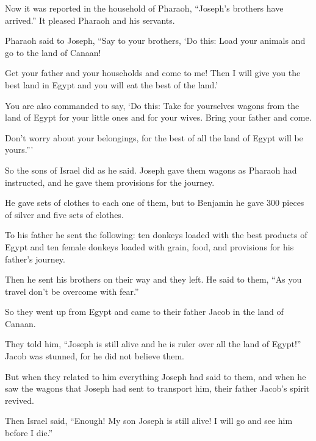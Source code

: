 \begin{scripture}
 Now it was reported in the household of Pharaoh, ``Joseph's brothers have arrived.'' It pleased Pharaoh and his servants.
 Pharaoh said to Joseph, ``Say to your brothers, `Do this: Load your animals and go to the land of Canaan!
 Get your father and your households and come to me! Then I will give you the best land in Egypt and you will eat the best of the land.'
 You are also commanded to say, `Do this: Take for yourselves wagons from the land of Egypt for your little ones and for your wives. Bring your father and come.
 Don't worry about your belongings, for the best of all the land of Egypt will be yours.'''
\everypar{}

 So the sons of Israel did as he said. Joseph gave them wagons as Pharaoh had instructed, and he gave them provisions for the journey.
 He gave sets of clothes to each one of them, but to Benjamin he gave 300 pieces of silver and five sets of clothes.
 To his father he sent the following: ten donkeys loaded with the best products of Egypt and ten female donkeys loaded with grain, food, and provisions for his father's journey.
 Then he sent his brothers on their way and they left. He said to them, ``As you travel don't be overcome with fear.''
\everypar{}

 So they went up from Egypt and came to their father Jacob in the land of Canaan.
 They told him, ``Joseph is still alive and he is ruler over all the land of Egypt!'' Jacob was stunned, for he did not believe them.
 But when they related to him everything Joseph had said to them, and when he saw the wagons that Joseph had sent to transport him, their father Jacob's spirit revived.
 Then Israel said, ``Enough! My son Joseph is still alive! I will go and see him before I die.''


\end{scripture}

